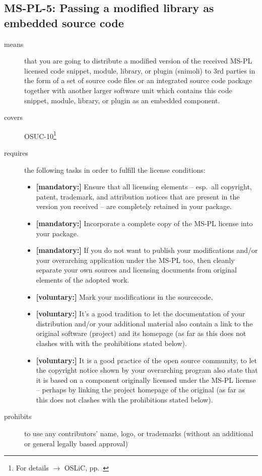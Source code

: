 \subsection{MS-PL-5: Passing a modified library as embedded source code}
\label{OSUC-10-MS-PL}
\begin{description}
\item[means] that you are going to distribute a modified version of the received
MS-PL licensed code snippet, module, library, or plugin (snimoli) to 3rd parties
in the form of a set of source code files or an integrated source code package
together with another larger software unit which contains this code snippet,
module, library, or plugin as an embedded component.

\item[covers] OSUC-10\footnote{For details $\rightarrow$ OSLiC, pp.\ \pageref{OSUC-10-DEF}}
\item[requires] the following tasks in order to fulfill the license conditions:
\begin{itemize}
 
 \item \textbf{[mandatory:]} Ensure that all licensing elements -- esp.\ all
  copyright, patent, trademark, and attribution notices that are present in the
  version you received -- are completely retained in your package.
 
  \item \textbf{[mandatory:]} Incorporate a complete copy of the MS-PL license
  into your package.
  
  \item \textbf{[mandatory:]} If you do not want to publish your modifications
  and/or your overarching application under the MS-PL too, then cleanly separate
  your own sources and licensing documents from original elements of the adopted
  work.
  
  \item \textbf{[voluntary:]} Mark your modifications in the sourcecode.
  
  \item \textbf{[voluntary:]} It's a good tradition to let the documentation of
  your distribution and/or your additional material also contain a link to the
  original software (project) and its homepage (as far as this does not clashes
  with with the prohibitions stated below).

  \item \textbf{[voluntary:]} It is a good practice of the open source
  community, to let the copyright notice shown by your overarching program also
  state that it is based on a component originally licensed under the MS-PL
  license -- perhaps by linking the project homepage of the original (as far as
  this does not clashes with the prohibitions stated below).
  
\end{itemize}

\item[prohibits] to use any contributors' name, logo, or trademarks (without an
additional or general legally based approval)

\end{description}

